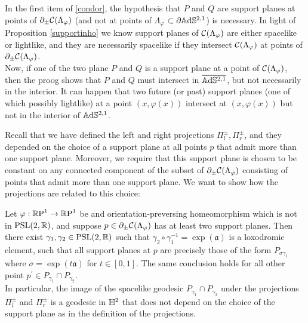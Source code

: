 \begin{observation}
In the first item of \ref{condor}, the hypothesis that $P$ and $Q$ are support planes at points of $\partial_\pm\CF$ (and not at points of $\Lambda_\varphi$ $\subset\partial\A^{2,1}$) is necessary. In light of Proposition \ref{supportinho} we know support planes of $\CF$ are either spacelike or lightlike, and they are necessarily spacelike if they intersect $\CF$ at points of $\partial_\pm\CF$. \\
Now, if one of the two plane $P$ and $Q$ is a support plane at a point of $\CF$, then the proog shows that $P$ and $Q$ must intersect in $\overline{\A^{2,1}}$, but not necessarily in the interior. It can happen that two future (or past) support planes (one of which possibly lightlike) at a point $(x,\varphi(x))$ intersect at $(x,\varphi(x))$ but not in the interior of $\A^{2,1}$.
\end{observation}
 
 Recall that we have defined the left and right projections $\Pi_l^\pm, \Pi_r^\pm$, and they depended on the choice of a support plane at all points $p$ that admit more than one support plane. Moreover, we require that this support plane is chosen to be constant on any connected component of the subset of $\partial_\pm\CF$ consisting of points that admit more than one support plane. We want to show how the projections are related to this choice:

\begin{corollary}\label{multipleplanes}
    Let $\varphi:\S\to\S$ be and orientation-preversing homeomorphism which is not in $\PSL$, and suppose $p\in \partial_\pm\CF$ has at least two support planes. Then there exist $\gamma_1,\gamma_2\in\PSL$ such that $\gamma_2\circ\gamma_1^{-1}=\exp(\mathfrak{a})$ is a loxodromic element, such that all support planes at $p$ are precisely those of the form $P_{\sigma\gamma_1}$ where $\sigma=\exp(t\mathfrak{a})$ for $t\in [0,1].$ The same conclusion holds for all other point $p^{\prime}\in P_{\gamma_1}\cap P_{\gamma_2}$. \\
    In particular, the image of the spacelike geodesic $P_{\gamma_1}\cap P_{\gamma_2}$ under the projections $\Pi_l^\pm$ and $\Pi_r^\pm$ is a geodesic in $\H^2$ that does not depend on the choice of the support plane as in the definition of the projections.  
\end{corollary}

